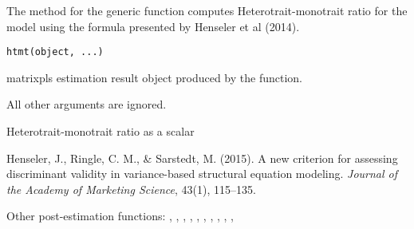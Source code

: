 \documentclass[a4paper]{book}
\begin{document}
%
\begin{Description}\relax
The  method for the generic function  computes Heterotrait-monotrait ratio 
for the model using the formula presented by Henseler et al (2014).
\end{Description}
%
\begin{Usage}
\begin{verbatim}
htmt(object, ...)
\end{verbatim}
\end{Usage}
%
\begin{Arguments}
\begin{ldescription}
\item[\code{object}] matrixpls estimation result object produced by the  function.

\item[\code{...}] All other arguments are ignored.
\end{ldescription}
\end{Arguments}
%
\begin{Value}
Heterotrait-monotrait ratio as a scalar
\end{Value}
%
\begin{References}\relax
Henseler, J., Ringle, C. M., \& Sarstedt, M. (2015). A new criterion for assessing discriminant validity in variance-based structural equation modeling. \emph{Journal of the Academy of Marketing Science}, 43(1), 115–135.
\end{References}
%
\begin{SeeAlso}\relax
Other post-estimation functions: 
,
,
,
,
,
,
,
,
,
,
\end{SeeAlso}
\end{document}
